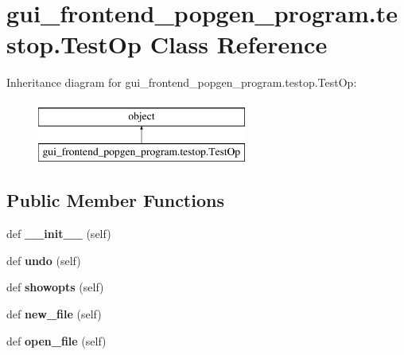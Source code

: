 \hypertarget{classgui__frontend__popgen__program_1_1testop_1_1TestOp}{}\section{gui\+\_\+frontend\+\_\+popgen\+\_\+program.\+testop.\+Test\+Op Class Reference}
\label{classgui__frontend__popgen__program_1_1testop_1_1TestOp}
Inheritance diagram for gui\+\_\+frontend\+\_\+popgen\+\_\+program.\+testop.\+Test\+Op\+:\begin{figure}[H]
\begin{center}
\leavevmode
\includegraphics[height=2.000000cm]{classgui__frontend__popgen__program_1_1testop_1_1TestOp}
\end{center}
\end{figure}
\subsection*{Public Member Functions}
\begin{DoxyCompactItemize}
\item 
def {\bfseries \+\_\+\+\_\+init\+\_\+\+\_\+} (self)\hypertarget{classgui__frontend__popgen__program_1_1testop_1_1TestOp_a62fe72498d0a17cb3b787f65ad7e8fa2}{}\label{classgui__frontend__popgen__program_1_1testop_1_1TestOp_a62fe72498d0a17cb3b787f65ad7e8fa2}

\item 
def {\bfseries undo} (self)\hypertarget{classgui__frontend__popgen__program_1_1testop_1_1TestOp_a45f28ae192207961e6a4464468ef1058}{}\label{classgui__frontend__popgen__program_1_1testop_1_1TestOp_a45f28ae192207961e6a4464468ef1058}

\item 
def {\bfseries showopts} (self)\hypertarget{classgui__frontend__popgen__program_1_1testop_1_1TestOp_ab138ecee8cba8a2e63822966e6f0ffa0}{}\label{classgui__frontend__popgen__program_1_1testop_1_1TestOp_ab138ecee8cba8a2e63822966e6f0ffa0}

\item 
def {\bfseries new\+\_\+file} (self)\hypertarget{classgui__frontend__popgen__program_1_1testop_1_1TestOp_a7de34c1036eeb8e2b2c5a02d0013d959}{}\label{classgui__frontend__popgen__program_1_1testop_1_1TestOp_a7de34c1036eeb8e2b2c5a02d0013d959}

\item 
def {\bfseries open\+\_\+file} (self)\hypertarget{classgui__frontend__popgen__program_1_1testop_1_1TestOp_a1d99054f9252eb3faa2e1bf829876811}{}\label{classgui__frontend__popgen__program_1_1testop_1_1TestOp_a1d99054f9252eb3faa2e1bf829876811}

\end{DoxyCompactItemize}



